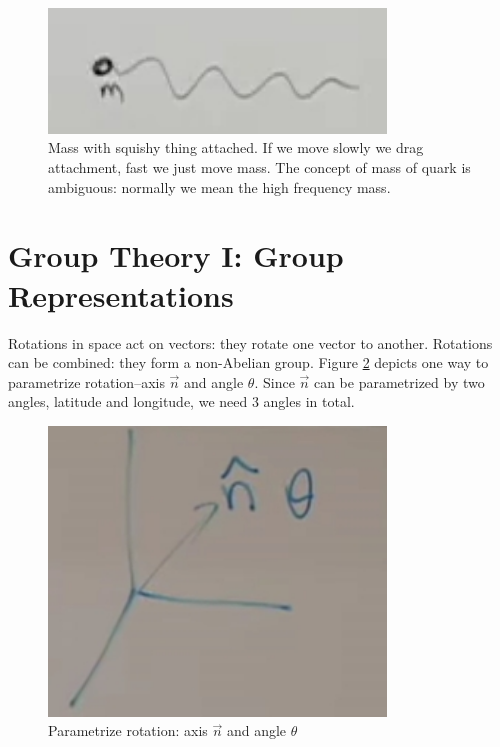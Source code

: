\documentclass[]{article}
\begin{document}
\begin{figure}[H]
	\caption[Mass (quark) with squishy thing attached]{Mass with squishy thing attached. If we move slowly we drag attachment, fast we just move mass. The concept of mass of quark is ambiguous: normally we mean the high frequency mass.}\label{fig:2-2-mass1}
	\includegraphics[width=0.8\textwidth]{2-2-mass1}
\end{figure}


\section{Group Theory I: Group Representations}

Rotations in space act on vectors: they rotate one vector to another. Rotations can be combined: they form a non-Abelian group. Figure \ref{fig:2-3-paramerize-rotation} depicts one way to parametrize rotation--axis $\vec{n}$ and angle $\theta$. Since $\vec{n}$ can be parametrized by two angles, latitude and longitude, we need 3 angles in total.

\begin{figure}[H]
	\begin{center}
		\caption{Parametrize rotation: axis $\vec{n}$ and angle $\theta$}\label{fig:2-3-paramerize-rotation}
		\includegraphics[width=0.8\textwidth]{2-3-paramerize-rotation}
	\end{center}
\end{figure}
\end{document}
